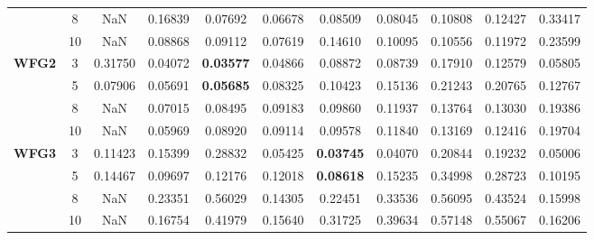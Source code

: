 \documentclass[conference]{IEEEtran}
\begin{document}
\begin{table*}[!htb]
\begin{tabular}{|c|c|c|c|c|c|c|c|c|c|c|}
		& 8          & NaN              & 0.16839           & 0.07692               & 0.06678          & 0.08509             & 0.08045             & 0.10808            & 0.12427              & 0.33417          \\ \cline{2-11} 
		& 10         & NaN              & 0.08868           & 0.09112               & 0.07619          & 0.14610             & 0.10095             & 0.10556            & 0.11972              & 0.23599          \\ \hline
		\multirow{4}{*}{\textbf{WFG2}}  & 3          & 0.31750          & 0.04072           & \textbf{0.03577}      & 0.04866          & 0.08872             & 0.08739             & 0.17910            & 0.12579              & 0.05805          \\ \cline{2-11} 
		& 5          & 0.07906          & 0.05691           & \textbf{0.05685}      & 0.08325          & 0.10423             & 0.15136             & 0.21243            & 0.20765              & 0.12767          \\ \cline{2-11} 
		& 8          & NaN              & 0.07015           & 0.08495               & 0.09183          & 0.09860             & 0.11937             & 0.13764            & 0.13030              & 0.19386          \\ \cline{2-11} 
		& 10         & NaN              & 0.05969           & 0.08920               & 0.09114          & 0.09578             & 0.11840             & 0.13169            & 0.12416              & 0.19704          \\ \hline
		\multirow{4}{*}{\textbf{WFG3}}  & 3          & 0.11423          & 0.15399           & 0.28832               & 0.05425          & \textbf{0.03745}    & 0.04070             & 0.20844            & 0.19232              & 0.05006          \\ \cline{2-11} 
		& 5          & 0.14467          & 0.09697           & 0.12176               & 0.12018          & \textbf{0.08618}    & 0.15235             & 0.34998            & 0.28723              & 0.10195          \\ \cline{2-11} 
		& 8          & NaN              & 0.23351           & 0.56029               & 0.14305          & 0.22451             & 0.33536             & 0.56095            & 0.43524              & 0.15998          \\ \cline{2-11} 
		& 10         & NaN              & 0.16754           & 0.41979               & 0.15640          & 0.31725             & 0.39634             & 0.57148            & 0.55067              & 0.16206          \\ \hline

\end{tabular}
\end{table*}
\end{document}
